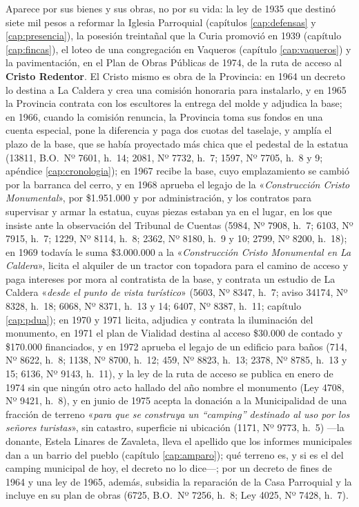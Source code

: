 Aparece por sus bienes y sus obras, no por su vida: la ley de 1935 que destinó siete mil pesos
a reformar la Iglesia Parroquial (capítulos \ref{cap:defensas} y \ref{cap:presencia}), la
posesión treintañal que la Curia promovió en 1939 (capítulo \ref{cap:fincas}), el loteo de una
congregación en Vaqueros (capítulo \ref{cap:vaqueros}) y la pavimentación, en el Plan de Obras
Públicas de 1974, de la ruta de acceso al \textbf{Cristo Redentor}. El Cristo mismo es obra de la Provincia: en 1964 un decreto lo destina a La Caldera y crea una comisión honoraria para instalarlo, y en 1965 la Provincia contrata con los escultores la entrega del molde y adjudica la base; en 1966, cuando la comisión renuncia, la Provincia toma sus fondos en una cuenta especial, pone la diferencia y paga dos cuotas del taselaje, y amplía el plazo de la base, que se había proyectado más chica que el pedestal de la estatua (13811, B.O.\ Nº 7601, h.\ 14; 2081, Nº 7732, h.\ 7; 1597, Nº 7705, h.\ 8 y 9; apéndice \ref{cap:cronologia}); en 1967 recibe la base, cuyo emplazamiento se cambió por la barranca del cerro, y en 1968 aprueba el legajo de la «\textit{Construcción Cristo Monumental}», por \$1.951.000 y por administración, y los contratos para supervisar y armar la estatua, cuyas piezas estaban ya en el lugar, en los que insiste ante la observación del Tribunal de Cuentas (5984, Nº 7908, h.\ 7; 6103, Nº 7915, h.\ 7; 1229, Nº 8114, h.\ 8; 2362, Nº 8180, h.\ 9 y 10; 2799, Nº 8200, h.\ 18); en 1969 todavía le suma \$3.000.000 a la «\textit{Construcción Cristo Monumental en La Caldera}», licita el alquiler de un tractor con topadora para el camino de acceso y paga intereses por mora al contratista de la base, y contrata un estudio de La Caldera «\textit{desde el punto de vista turístico}» (5603, Nº 8347, h.\ 7; aviso 34174, Nº 8328, h.\ 18; 6068, Nº 8371, h.\ 13 y 14; 6407, Nº 8387, h.\ 11; capítulo \ref{cap:pdua}); en 1970 y 1971 licita, adjudica y contrata la iluminación del monumento, en 1971 el plan de Vialidad destina al acceso \$30.000 de contado y \$170.000 financiados, y en 1972 aprueba el legajo de un edificio para baños (714, Nº 8622, h.\ 8; 1138, Nº 8700, h.\ 12; 459, Nº 8823, h.\ 13; 2378, Nº 8785, h.\ 13 y 15; 6136, Nº 9143, h.\ 11), y la ley de la ruta de acceso se publica en enero de 1974 sin que ningún otro acto hallado del año nombre el monumento (Ley 4708, Nº 9421, h.\ 8), y en junio de 1975 acepta la donación a la Municipalidad de una fracción de terreno «\textit{para que se construya un ``camping'' destinado al uso por los señores turistas}», sin catastro, superficie ni ubicación (1171, Nº 9773, h.\ 5) ---la donante, Estela Linares de Zavaleta, lleva el apellido que los informes municipales dan a un barrio del pueblo (capítulo \ref{cap:amparo}); qué terreno es, y si es el del camping municipal de hoy, el decreto no lo dice---; por un decreto de fines de 1964 y una ley de 1965, además, subsidia la reparación de la Casa Parroquial y la incluye en su plan de obras (6725, B.O.\ Nº 7256, h.\ 8; Ley 4025, Nº 7428, h.\ 7).

